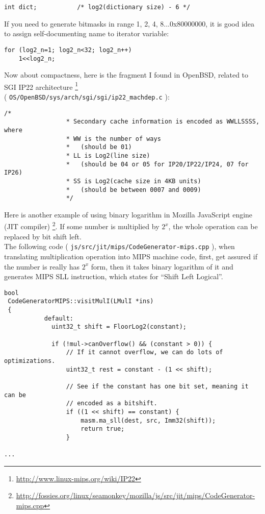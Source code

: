 \begin{lstlisting}[caption=C code,style=customc]
    int dict;           /* log2(dictionary size) - 6 */
\end{lstlisting}

If you need to generate bitmasks in range 1, 2, 4, 8...0x80000000, it is good idea to assign self-documenting name to iterator variable:

\begin{lstlisting}[caption=C code,style=customc]
for (log2_n=1; log2_n<32; log2_n++)
    1<<log2_n;
\end{lstlisting}

Now about compactness, here is the fragment I found in OpenBSD, related to SGI IP22 architecture
\footnote{\url{http://www.linux-mips.org/wiki/IP22}} \\
( \texttt{OS/OpenBSD/sys/arch/sgi/sgi/ip22\_machdep.c} ):

\begin{lstlisting}[caption=C code,style=customc]
                /*
                 * Secondary cache information is encoded as WWLLSSSS, where
                 * WW is the number of ways
                 *   (should be 01)
                 * LL is Log2(line size)
                 *   (should be 04 or 05 for IP20/IP22/IP24, 07 for IP26)
                 * SS is Log2(cache size in 4KB units)
                 *   (should be between 0007 and 0009)
                 */
\end{lstlisting}

Here is another example of using binary logarithm in Mozilla JavaScript engine (JIT compiler)
\footnote{\url{http://fossies.org/linux/seamonkey/mozilla/js/src/jit/mips/CodeGenerator-mips.cpp}}.
If some number is multiplied by $2^x$, the whole operation can be replaced by bit shift left. \\
The following code ( \texttt{js/src/jit/mips/CodeGenerator-mips.cpp} ), 
when translating multiplication operation into MIPS machine code, first, get assured if the number 
is really has $2^x$ form, then it takes binary logarithm of it and generates MIPS SLL instruction, which states for ``Shift Left Logical''.

\begin{lstlisting}[caption=Mozilla JavaScript JIT compiler (translating multiplication operation into MIPS bit shift instruction),style=customc]
bool
 CodeGeneratorMIPS::visitMulI(LMulI *ins)
 {
           default:
             uint32_t shift = FloorLog2(constant);
 
             if (!mul->canOverflow() && (constant > 0)) {
                 // If it cannot overflow, we can do lots of optimizations.
                 uint32_t rest = constant - (1 << shift);
 
                 // See if the constant has one bit set, meaning it can be
                 // encoded as a bitshift.
                 if ((1 << shift) == constant) {
                     masm.ma_sll(dest, src, Imm32(shift));
                     return true;
                 }

...

\end{lstlisting}

